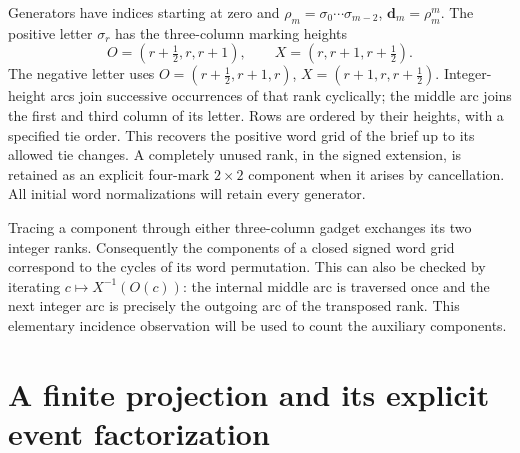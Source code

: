 \documentclass[11pt,a4paper]{article}
\theoremstyle{remark}
\begin{document}
Generators have indices starting at zero and
$\rho_m=\sigma_0\cdots\sigma_{m-2}$,
$\mathbf d_m=\rho_m^m$.  The positive letter $\sigma_r$ has the
three-column marking heights
\[
 O=(r+\tfrac12,r,r+1),\qquad
 X=(r,r+1,r+\tfrac12).
\]
The negative letter uses
$O=(r+\tfrac12,r+1,r)$,
$X=(r+1,r,r+\tfrac12)$.
Integer-height arcs join successive occurrences of that rank
cyclically; the middle arc joins the first and third column of its
letter.  Rows are ordered by their heights, with a specified tie
order.  This recovers the positive word grid of the brief up to its
allowed tie changes.  A completely unused rank, in the signed
extension, is retained as an explicit four-mark $2\times2$ component
when it arises by cancellation.  All initial word normalizations
will retain every generator.

Tracing a component through either three-column gadget exchanges
its two integer ranks.  Consequently the components of a closed
signed word grid correspond to the cycles of its word permutation.
This can also be checked by iterating
$c\mapsto X^{-1}(O(c))$: the internal middle arc is traversed once
and the next integer arc is precisely the outgoing arc of the
transposed rank.  This elementary incidence observation will be used
to count the auxiliary components.


\section{A finite projection and its explicit event factorization}
\label{sec:finite-projection-complete}
\end{document}
